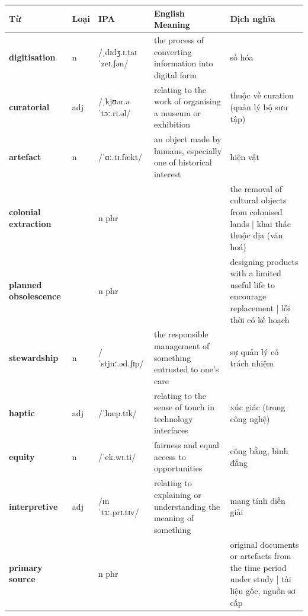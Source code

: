 \vspace{0.8em}
\begin{center}
\renewcommand{\arraystretch}{1.65}
\begin{tabularx}{\textwidth}{|V{0.22\textwidth}|C{0.07\textwidth}|I{0.20\textwidth}|Y|V{0.18\textwidth}|}
\hline
{}
\textbf{Từ} & \textbf{Loại} & \textbf{IPA} & \textbf{English Meaning} & \textbf{Dịch nghĩa} \\
\hline
\textbf{digitisation} & n & /ˌdɪdʒ.ɪ.taɪˈzeɪ.ʃən/ & the process of converting information into digital form & số hóa \\ \hline
\textbf{curatorial} & adj & /ˌkjʊər.əˈtɔː.ri.əl/ & relating to the work of organising a museum or exhibition & thuộc về curation (quản lý bộ sưu tập) \\ \hline
\textbf{artefact} & n & /ˈɑː.tɪ.fækt/ & an object made by humans, especially one of historical interest & hiện vật \\ \hline
\textbf{colonial extraction} & & n phr & & the removal of cultural objects from colonised lands | khai thác thuộc địa (văn hoá) \\ \hline
\textbf{planned obsolescence} & & n phr & & designing products with a limited useful life to encourage replacement | lỗi thời có kế hoạch \\ \hline
\textbf{stewardship} & n & /ˈstjuː.əd.ʃɪp/ & the responsible management of something entrusted to one's care & sự quản lý có trách nhiệm \\ \hline
\textbf{haptic} & adj & /ˈhæp.tɪk/ & relating to the sense of touch in technology interfaces & xúc giác (trong công nghệ) \\ \hline
\textbf{equity} & n & /ˈek.wɪ.ti/ & fairness and equal access to opportunities & công bằng, bình đẳng \\ \hline
\textbf{interpretive} & adj & /ɪnˈtɜː.prɪ.tɪv/ & relating to explaining or understanding the meaning of something & mang tính diễn giải \\ \hline
\textbf{primary source} & & n phr & & original documents or artefacts from the time period under study | tài liệu gốc, nguồn sơ cấp \\ \hline
\end{tabularx}
\end{center}

\newpage


